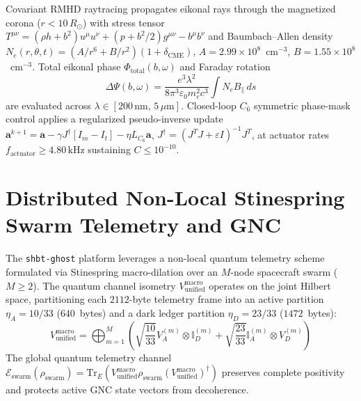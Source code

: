 \documentclass[twocolumn,aps,pra,floatfix,superscriptaddress,10pt]{revtex4-2}
\begin{document}
Covariant RMHD raytracing propagates eikonal rays through the magnetized corona
($r < 10\,R_\odot$) with stress tensor $T^{\mu\nu} = (\rho h + b^2) u^\mu u^\nu +
(p + b^2/2) g^{\mu\nu} - b^\mu b^\nu$ and Baumbach--Allen density
$N_e(r,\theta,t) = (A/r^6 + B/r^2)(1 + \delta_{\text{CME}})$, $A = 2.99 \times
10^{8}$~cm$^{-3}$, $B = 1.55 \times 10^{8}$~cm$^{-3}$. Total eikonal phase
$\Phi_{\text{total}}(b,\omega)$ and Faraday rotation
\begin{equation}
\Delta\Psi(b,\omega) = \frac{e^3 \lambda^2}{8\pi^3 \varepsilon_0 m_e^2 c^3} \int N_e B_\parallel \, ds
\label{eq:faraday}
\end{equation}
are evaluated across $\lambda \in [200\,\text{nm},\,5\,\mu\text{m}]$. Closed-loop
$C_6$ symmetric phase-mask control applies a regularized pseudo-inverse update
$\mathbf{a}^{k+1} = \mathbf{a} - \gamma J^\dagger [I_m - I_t] - \eta L_{C_6}
\mathbf{a}$, $J^\dagger = (J^T J + \varepsilon I)^{-1} J^T$, at actuator rates
$f_{\text{actuator}} \ge 4.80\,\text{kHz}$ sustaining $C \le 10^{-10}$.


\section{Distributed Non-Local Stinespring Swarm Telemetry and GNC}
\label{sec:stinespring_gnc}

The \texttt{shbt-ghost} platform leverages a non-local quantum telemetry scheme formulated via Stinespring macro-dilation over an $M$-node spacecraft swarm ($M \ge 2$). The quantum channel isometry $V_{\text{unified}}^{\text{macro}}$ operates on the joint Hilbert space, partitioning each $2112$-byte telemetry frame into an active partition $\eta_A = 10/33$ ($640$~bytes) and a dark ledger partition $\eta_D = 23/33$ ($1472$~bytes):
\begin{equation}
V_{\text{unified}}^{\text{macro}} = \bigoplus_{m=1}^{M} \left( \sqrt{\frac{10}{33}} V_{A}^{(m)} \otimes \mathbb{I}_{D}^{(m)} + \sqrt{\frac{23}{33}} \mathbb{I}_{A}^{(m)} \otimes V_{D}^{(m)} \right)
\label{eq:stinespring_dilation}
\end{equation}
The global quantum telemetry channel $\mathcal{E}_{\text{swarm}}(\rho_{\text{swarm}}) = \text{Tr}_{E} \left( V_{\text{unified}}^{\text{macro}} \rho_{\text{swarm}} (V_{\text{unified}}^{\text{macro}})^\dagger \right)$ preserves complete positivity and protects active GNC state vectors from decoherence.
\end{document}
